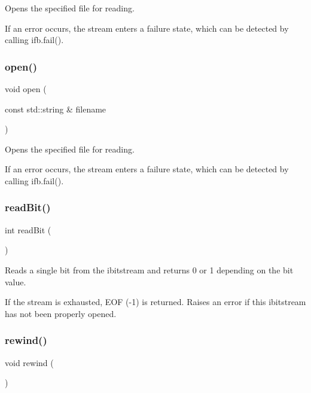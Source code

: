 Opens the specified file for reading. 

If an error occurs, the stream enters a failure state, which can be detected by calling ifb.\+fail(). \mbox{\label{classifbitstream_a72f6f3d1b9bc5a4275359cc0a83a60bd}} 
\subsubsection{\texorpdfstring{open()}{open()}\hspace{0.1cm}{\footnotesize\ttfamily [2/2]}}
{\footnotesize\ttfamily void open (\begin{DoxyParamCaption}\item[{const std\+::string \&}]{filename }\end{DoxyParamCaption})}



Opens the specified file for reading. 

If an error occurs, the stream enters a failure state, which can be detected by calling ifb.\+fail(). \mbox{\label{classibitstream_aa8c615fa7957fb0232a0873dadbd39e8}} 
\subsubsection{\texorpdfstring{read\+Bit()}{readBit()}}
{\footnotesize\ttfamily int read\+Bit (\begin{DoxyParamCaption}{ }\end{DoxyParamCaption})\hspace{0.3cm}{\ttfamily [inherited]}}



Reads a single bit from the ibitstream and returns 0 or 1 depending on the bit value. 

If the stream is exhausted, E\+OF (-\/1) is returned. Raises an error if this ibitstream has not been properly opened. \mbox{\label{classibitstream_ab8734e666421c9fe3b6380a818c6c727}} 
\subsubsection{\texorpdfstring{rewind()}{rewind()}}
{\footnotesize\ttfamily void rewind (\begin{DoxyParamCaption}{ }\end{DoxyParamCaption})\hspace{0.3cm}{\ttfamily [inherited]}}



